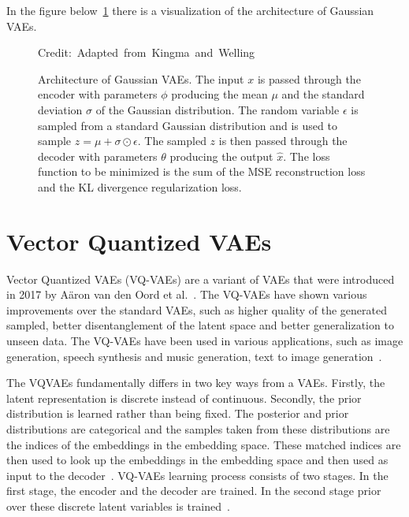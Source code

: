 In the figure below~\ref{VAEFigure} there is a visualization of the architecture of Gaussian VAEs.

\begin{figure}[H]
    \centering 
    
    \caption[Architecture of Gaussian VAEs.]%
    { Architecture of Gaussian VAEs. The input $x$ is passed through the encoder with parameters $\phi$ producing the mean $\mu$ and the standard deviation $\sigma$ of the Gaussian distribution. The random variable $\epsilon$ is sampled from a standard Gaussian distribution and is used to sample $ z = \mu + \sigma \odot \epsilon$. The sampled $z$ is then passed through the decoder with parameters $\theta$ producing the output $\hat{x}$. The loss function to be minimized is the sum of the MSE reconstruction loss and the KL divergence regularization loss. 
    }
  	\medskip 
	\hspace*{15pt}\hbox{\scriptsize Credit: Adapted from Kingma and Welling~\cite{Kingma_2019} }\label{VAEFigure}
\end{figure}

\section{Vector Quantized VAEs}
\label{background:vqvae}

Vector Quantized VAEs (VQ-VAEs) are a variant of VAEs that were introduced in 2017 by Aäron van den Oord et al.~\cite{vqvae}. The VQ-VAEs have shown various improvements over the standard VAEs, such as higher quality of the generated sampled, better disentanglement of the latent space and better generalization to unseen data. The VQ-VAEs have been used in various applications, such as image generation, speech synthesis and music generation, text to image generation~\cite{vqvae2,vqvaespeechsynthesis, musicvqvae,dalle}.

The VQVAEs fundamentally differs in two key ways from a VAEs. Firstly, the latent representation is discrete instead of continuous. Secondly, the prior distribution is learned rather than being fixed. The posterior and prior distributions are categorical and the samples taken from these distributions are the indices of the embeddings in the embedding space. These matched indices are then used to look up the embeddings in the embedding space and then used as input to the decoder~\cite{vqvae}. VQ-VAEs learning
process consists of two stages. In the first stage, the encoder and the decoder are trained. In the second stage prior over these discrete latent variables is trained~\cite{vqvae}.


